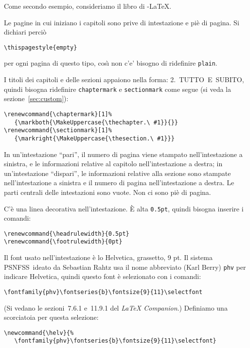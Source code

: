 \documentclass[a4paper,italian]{article}
\def\latex/{\protect\LaTeX{}}
\def\ams/{\protect\pAmS}
\def\pAmS{{\the\textfont2
        A\kern-.1667em\lower.5ex\hbox{M}\kern-.125emS}}
\def\amslatex/{\ams/-\latex/}
\newcommand{\PSNFSS}{{\sf
    PSNFSS}}
\newcommand{\bs}{\symbol{'134}}
\newcommand{\Cmd}[1]{\texttt{\def\{{\char`\{}\def\}{\char`\}}\bs#1}}
\begin{document}
Come secondo esempio, consideriamo il libro di \amslatex/.%

Le pagine in cui iniziano i capitoli sono prive di intestazione e pi\`e
di pagina. Si dichiari perci\`o
\begin{verbatim}
\thispagestyle{empty}
\end{verbatim}
per ogni pagina di questo tipo, cos\`{\i} non c'e' bisogno di ridefinire
\texttt{plain}.

I titoli dei capitoli e delle sezioni appaiono nella forma:
\mbox{2.\ TUTTO E SUBITO}, quindi bisogna ridefinire \Cmd{chaptermark}
e \Cmd{sectionmark} come segue (si veda la sezione~\ref{sec:custom}):

\begin{verbatim}
\renewcommand{\chaptermark}[1]%
   {\markboth{\MakeUppercase{\thechapter.\ #1}}{}}
\renewcommand{\sectionmark}[1]%
   {\markright{\MakeUppercase{\thesection.\ #1}}}
\end{verbatim}

In un'intestazione ``pari'', il numero di pagina viene stampato
nell'intestazione a sinistra, e le informazioni relative al capitolo
nell'intestazione a destra; in un'intestazione ``dispari'', le
informazioni relative alla sezione sono stampate nell'intestazione a
sinistra e il numero di pagina nell'intestazione a destra. Le parti
centrali delle intestazioni sono vuote.  Non ci sono pi\`e di pagina.

C'\`e una linea decorativa nell'intestazione. \`E alta \texttt{0.5pt},
quindi bisogna inserire i comandi:

\begin{verbatim}
\renewcommand{\headrulewidth}{0.5pt}
\renewcommand{\footrulewidth}{0pt}
\end{verbatim}

Il font usato nell'intestazione \`e lo Helvetica, grassetto, 9 pt.
Il sistema \PSNFSS\ ideato da Sebastian Rahtz usa il nome abbreviato
(Karl Berry) \verb|phv| per indicare Helvetica, quindi questo font
\`e selezionato con i comandi:
\begin{verbatim}
\fontfamily{phv}\fontseries{b}\fontsize{9}{11}\selectfont
\end{verbatim}
(Si vedano le sezioni~7.6.1 e~11.9.1 del \emph{\latex/ Companion}.)
Definiamo una scorciatoia per questa selezione:
\begin{verbatim}
\newcommand{\helv}{%
   \fontfamily{phv}\fontseries{b}\fontsize{9}{11}\selectfont}
\end{verbatim}
\end{document}

